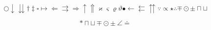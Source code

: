 
\begin{equation}
\bigcirc\downarrow\downdownarrows\dagger\ddagger\square\mapsto\Leftarrow\rightrightarrows\Rightarrow\uparrow\Uparrow\varkappa\varsigma\varrho\vartheta\bullet\leftarrow\leftleftarrows\upuparrows\because\propto\star\therefore\mp\odot\pm\sqcap\sqcup
\end{equation}

\begin{equation}
\ast\sqcap\sqcup\mp\odot\pm\angle\doteq
\end{equation}
